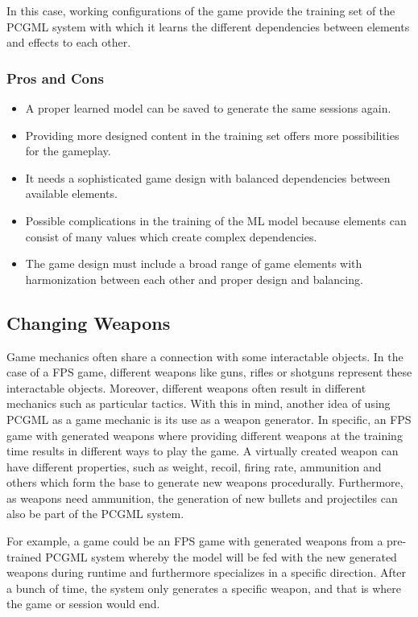 \documentclass[MGS,Master,english]{twbook}%
\begin{document}
In this case, working configurations of the game provide the training set of the PCGML system with which it learns the different dependencies between elements and effects to each other. 

\subsubsection{Pros and Cons}
\begin{itemize}
	\item A proper learned model can be saved to generate the same sessions again.
	\item Providing more designed content in the training set offers more possibilities for the gameplay.
	\item It needs a sophisticated game design with balanced dependencies between available elements.
	\item Possible complications in the training of the ML model because elements can consist of many values which create complex dependencies.
	\item The game design must include a broad range of game elements with harmonization between each other and proper design and balancing.
\end{itemize}

\subsection{Changing Weapons} \label{idea::changingWeapons}
Game mechanics often share a connection with some interactable objects. In the case of a \ac{FPS} game, different weapons like guns, rifles or shotguns represent these interactable objects. Moreover, different weapons often result in different mechanics such as particular tactics. With this in mind, another idea of using PCGML as a game mechanic is its use as a weapon generator. In specific, an FPS game with generated weapons where providing different weapons at the training time results in different ways to play the game. A virtually created weapon can have different properties, such as weight, recoil, firing rate, ammunition and others which form the base to generate new weapons procedurally. Furthermore, as weapons need ammunition, the generation of new bullets and projectiles can also be part of the PCGML system. 

For example, a game could be an FPS game with generated weapons from a pre-trained PCGML system whereby the model will be fed with the new generated weapons during runtime and furthermore specializes in a specific direction. After a bunch of time, the system only generates a specific weapon, and that is where the game or session would end.
\end{document}

